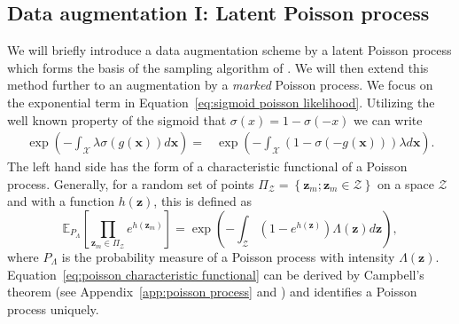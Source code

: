 \documentclass[twoside,11pt]{article}
\newcommand{\EE}[2]{\mathbb{E}_{#1}\left[ #2 \right]}
\newcommand{\set}[1]{\left\lbrace #1 \right\rbrace}
\newcommand{\bs}[1]{\boldsymbol{#1}}
\newcommand{\bx}{\boldsymbol{x}}
\newcommand{\bz}{\boldsymbol{z}}
\newcommand{\calZ}{\mathcal{Z}}
\newcommand{\X}{\mathcal{X}}
\begin{document}
\subsection{Data augmentation I: Latent Poisson process}
We will briefly introduce a data augmentation scheme by a latent Poisson process which forms the basis of 
the sampling algorithm of \citet{adams2009tractable}. We will then extend this method further to an 
augmentation by a {\em marked} Poisson process.
We focus on the exponential term in Equation~\eqref{eq:sigmoid poisson likelihood}. Utilizing the well known property of the sigmoid 
that $\sigma(x) = 1 - \sigma(-x)$ we can write
\begin{equation}\label{eq:exponent integral}
\begin{split}
\exp\left(-\int_{\X}\lambda\sigma(g(\bx))d\bx\right) = & \exp\left(-\int_{\X}
\left(1 - \sigma(-g(\bx))\right) \lambda d\bx \right).
\end{split}
\end{equation}
The left hand side has the form of a characteristic functional of a Poisson process. Generally, for a random set of points $\Pi_\calZ=\set{\bz_m;\bz_m\in \calZ}$ on a space $\calZ$ and with a function $h(\bs{z})$, this is defined as
\begin{equation}\label{eq:poisson characteristic functional}
\EE{P_\Lambda}{\prod_{\bs{z}_m\in\Pi_{\mathcal{Z}}} e^{h(\bs{z}_m)}} = \exp\left(-\int_{\mathcal{Z}}\left(1 - e^{h(\bs{z})}\right)\Lambda(\bs{z})d\bs{z}\right),
\end{equation}
where $P_\Lambda$ is the probability measure of a Poisson process with intensity $\Lambda(\bs{z})$. Equation~\eqref{eq:poisson characteristic functional} can be derived by Campbell's theorem (see Appendix~\ref{app:poisson process} and \citep[chap. 3]{kingman1993poisson}) and identifies a Poisson process uniquely. 
\end{document}
